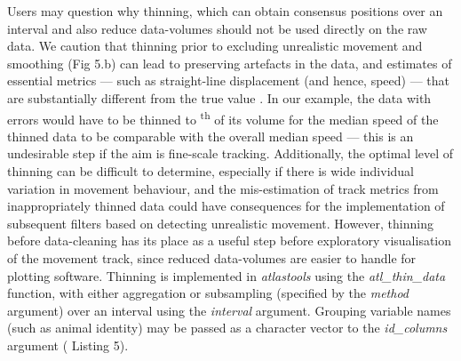 \begin{refsection}[sorting=nyt]
    Users may question why thinning, which can obtain consensus positions over an interval and also reduce data-volumes should not be used directly on the raw data.
    We caution that thinning prior to excluding unrealistic movement and smoothing (Fig 5.b) can lead to preserving artefacts in the data, and estimates of essential metrics --- such as straight-line displacement (and hence, speed) --- that are substantially different from the true value \citep[see Fig. 5.c;][]{noonan2019}.
    In our example, the data with errors would have to be thinned to \textsuperscript{th} of its volume for the median speed of the thinned data to be comparable with the overall median speed --- this is an undesirable step if the aim is fine-scale tracking.
    Additionally, the optimal level of thinning can be difficult to determine, especially if there is wide individual variation in movement behaviour, and the mis-estimation of track metrics from inappropriately thinned data could have consequences for the implementation of subsequent filters based on detecting unrealistic movement.
    However, thinning before data-cleaning has its place as a useful step before exploratory visualisation of the movement track, since reduced data-volumes are easier to handle for plotting software.
    Thinning is implemented in \textit{atlastools} using the \textit{atl\_thin\_data} function, with either aggregation or subsampling (specified by the \textit{method} argument) over an interval using the \textit{interval} argument.
    Grouping variable names (such as animal identity) may be passed as a character vector to the \textit{id\_columns} argument ({\color{red} Listing} 5).



\end{refsection}
